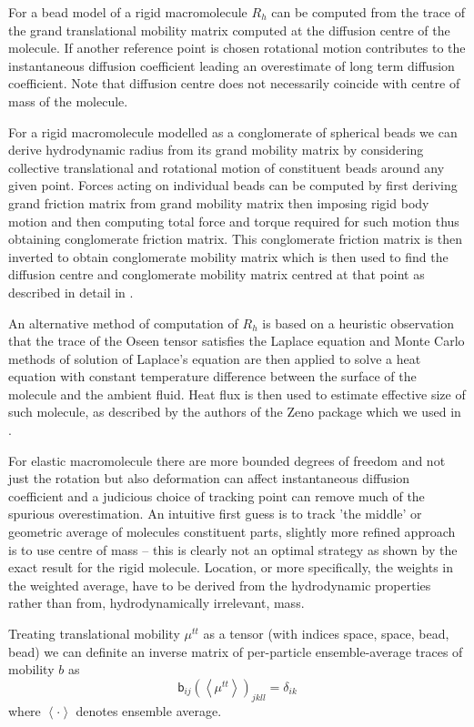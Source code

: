 \documentclass{doctoral}
\newcommand{\mm}[1]{\bm{\mathsf{#1}}} %
\begin{document}
For a bead model of a rigid macromolecule $R_h$ can be computed from the trace of the grand translational mobility matrix computed at the diffusion centre of the molecule\cite{Zuk_2018}.
If another reference point is chosen rotational motion contributes to the instantaneous diffusion coefficient leading an overestimate of long term diffusion coefficient\cite{Cichocki_2015}.
Note that diffusion centre does not necessarily coincide with centre of mass of the molecule.

For a rigid macromolecule modelled as a conglomerate of spherical beads we can derive hydrodynamic radius from its grand mobility matrix by considering collective translational and rotational motion of constituent beads around any given point.
Forces acting on individual beads can be computed by first deriving grand friction matrix from grand mobility matrix then imposing rigid body motion and then computing total force and torque required for such motion thus obtaining conglomerate friction matrix.
This conglomerate friction matrix is then inverted to obtain conglomerate mobility matrix which is then used to find the diffusion centre and conglomerate mobility matrix centred at that point as described in detail in \cite{Cichocki_2019}.

An alternative method of computation of $R_h$ is based on a heuristic observation that the trace of the Oseen tensor satisfies the Laplace equation and Monte Carlo methods of solution of Laplace's equation are then applied to solve a heat equation with constant temperature difference between the surface of the molecule and the ambient fluid.
Heat flux is then used to estimate effective size of such molecule, as described by the authors of the Zeno package \cite{Juba_2017} which we used in \textcite{Waszkiewicz_2023_dna}.

For elastic macromolecule there are more bounded degrees of freedom and not just the rotation but also deformation can affect instantaneous diffusion coefficient and a judicious choice of tracking point can remove much of the spurious overestimation.
An intuitive first guess is to track 'the middle' or geometric average of molecules constituent parts, slightly more refined approach is to use centre of mass -- this is clearly not an optimal strategy as shown by the exact result for the rigid molecule.
Location, or more specifically, the weights in the weighted average, have to be derived from the hydrodynamic properties rather than from, hydrodynamically irrelevant, mass.

Treating translational mobility $\mm{\mu}^{tt}$ as a tensor (with indices space, space, bead, bead) we can definite an inverse matrix of per-particle ensemble-average traces of mobility $b$ as
\begin{equation}
    \mm{b}_{ij} \left(\left< \mm{\mu}^{tt} \right> \right)_{jkll} = \mm{\delta}_{ik}
\end{equation}
where $\left< \cdot \right>$ denotes ensemble average.
\end{document}
